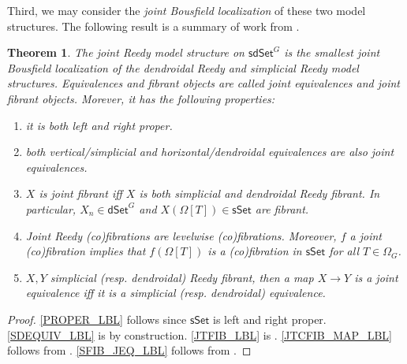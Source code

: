 \documentclass[a4paper,10pt
,draft
]{article}%
\numberwithin{equation}{section}
\numberwithin{figure}{section}
\newtheorem{theorem}[equation]{Theorem}%
\theoremstyle{definition} %
\newcommand{\sSet}{\ensuremath{\mathsf{sSet}}}%
\newcommand{\dSet}{\mathsf{dSet}}
\newcommand{\1}{\ensuremath{\mathbbm 1}}%
\begin{document}
Third, we may consider the \textit{joint Bousfield localization} of these two model structures.
The following result is a summary of work from \cite[\S 4.1]{BP_edss}.
\begin{theorem}
      \label{JB_THM}
      The \textit{joint Reedy model structure} on $\mathsf{sdSet}^G$ is the smallest joint Bousfield localization of the dendroidal Reedy and simplicial Reedy model structures.
      Equivalences and fibrant objects are called \textit{joint equivalences} and \textit{joint fibrant objects}.
      Morever, it has the following properties:
      \begin{enumerate}[label = (\roman*)]
      \item \label{PROPER_LBL} it is both left and right proper.
      \item \label{SDEQUIV_LBL} both vertical/simplicial and horizontal/dendroidal equivalences are also joint equivalences.
      \item \label{JTFIB_LBL} $X$ is joint fibrant iff $X$ is both simplicial and dendroidal Reedy fibrant.
            In particular, $X_n \in \dSet^G$ and $X(\Omega[T]) \in \sSet$ are fibrant.
      \item \label{JTCFIB_MAP_LBL} Joint Reedy (co)fibrations are levelwise (co)fibrations.
            Moreover, $f$ a joint (co)fibration implies that $f(\Omega[T])$ is a (co)fibration in $\sSet$ for all $T \in \Omega_G$.
      \item \label{SFIB_JEQ_LBL} $X,Y$ simplicial (resp. dendroidal) Reedy fibrant, then a map $X \to Y$ is a joint equivalence iff it is a simplicial (resp. dendroidal) equivalence.
      \end{enumerate}
\end{theorem}
\begin{proof}
      \ref{PROPER_LBL} follows since $\sSet$ is left and right proper.
      \ref{SDEQUIV_LBL} is by construction.
      \ref{JTFIB_LBL} is \cite[Prop. 4.1(ii)]{BP_edss}.
      \ref{JTCFIB_MAP_LBL} follows from \cite[Lemmas A.27, A.29]{BP_edss}.
      \ref{SFIB_JEQ_LBL} follows from \cite[Prop. 4.5(iii), Cor. 4.29(iii)]{BP_edss}.      
\end{proof}
\end{document}
